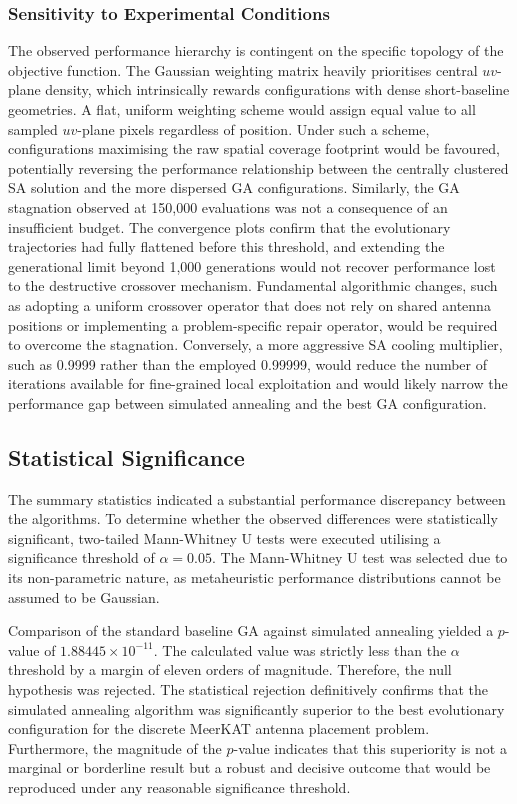\documentclass[conference]{IEEEtran}
\begin{document}
\subsubsection{Sensitivity to Experimental Conditions}
The observed performance hierarchy is contingent on the specific topology of the objective
function. The Gaussian weighting matrix heavily prioritises central $uv$-plane density, which
intrinsically rewards configurations with dense short-baseline geometries. A flat, uniform
weighting scheme would assign equal value to all sampled $uv$-plane pixels regardless of
position. Under such a scheme, configurations maximising the raw spatial coverage footprint
would be favoured, potentially reversing the performance relationship between the centrally
clustered SA solution and the more dispersed GA configurations. Similarly, the GA stagnation
observed at 150,000 evaluations was not a consequence of an insufficient budget. The
convergence plots confirm that the evolutionary trajectories had fully flattened before this
threshold, and extending the generational limit beyond 1,000 generations would not recover
performance lost to the destructive crossover mechanism. Fundamental algorithmic changes, such
as adopting a uniform crossover operator that does not rely on shared antenna positions or
implementing a problem-specific repair operator, would be required to overcome the stagnation.
Conversely, a more aggressive SA cooling multiplier, such as 0.9999 rather than the employed
0.99999, would reduce the number of iterations available for fine-grained local exploitation
and would likely narrow the performance gap between simulated annealing and the best GA
configuration.
 
\subsection{Statistical Significance}
 
The summary statistics indicated a substantial performance discrepancy between the algorithms.
To determine whether the observed differences were statistically significant, two-tailed
Mann-Whitney U tests were executed utilising a significance threshold of $\alpha = 0.05$.
The Mann-Whitney U test was selected due to its non-parametric nature, as metaheuristic
performance distributions cannot be assumed to be Gaussian.
 
Comparison of the standard baseline GA against simulated annealing yielded a $p$-value of
$1.88445 \times 10^{-11}$. The calculated value was strictly less than the $\alpha$ threshold by
a margin of eleven orders of magnitude. Therefore, the null hypothesis was rejected. The
statistical rejection definitively confirms that the simulated annealing algorithm was
significantly superior to the best evolutionary configuration for the discrete MeerKAT antenna
placement problem. Furthermore, the magnitude of the $p$-value indicates that this superiority
is not a marginal or borderline result but a robust and decisive outcome that would be
reproduced under any reasonable significance threshold.
 
\end{document}
